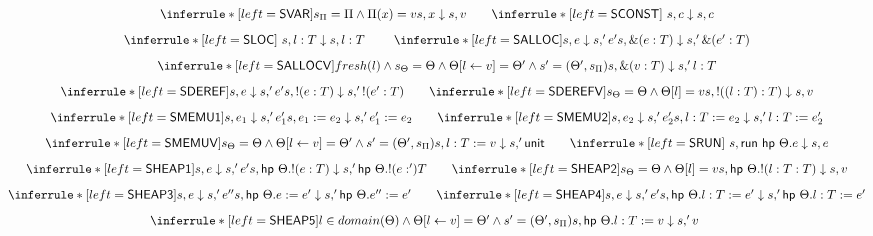 \begin{figure}[H]
 \small
  \[
\begin{array}{@{}c@{}}
   \inferrule*[left=\kw{SVAR}]{s_\kvm = \kvm \wedge \kvm(x) = v}{\eval s x s v} \ \ \ \ \ \
      \inferrule*[left=\kw{SCONST}]{~}{\eval s c s c}\\[2ex]
      \inferrule*[left=\kw{SLOC}]{~}{\eval s {\addr l T} s {\addr l T}}\ \ \ \ \ \ \
      
       \inferrule*[left=\kw{SALLOC}]{\eval s e s' e'}{\eval s {\alloc e T} s' {\alloc {e'} T}}\\[2ex]
       \inferrule*[left=\kw{SALLOCV}]{fresh(l) \wedge s_\Theta = \Theta \wedge \kheap[l \leftarrow v] = \kheap' \wedge s' = (\kheap', s_\kvm)}{\eval s {\alloc v T}s' {\addr l T}}\\[2ex]
       
       \inferrule*[left=\kw{SDEREF}]{\eval s e s' e'}{\eval s {\deref e T} s' {\deref {e'} T}}\ \ \ \ \ \
       \inferrule*[left=\kw{SDEREFV}]{s_\Theta = \Theta  \wedge \kheap[l] = v}{\eval s {\deref {(\addr l T)} T} s v}\\[2ex]      
       \inferrule*[left=\kw{SMEMU1}]{\eval s {e_1} s' {e_1'}}{\eval s {\eass {e_1} {e_2}} s' {\eass {e_1'} {e_2}}}\ \ \ \ \ \
       \inferrule*[left=\kw{SMEMU2}]{\eval s {e_2} s' {e_2'}}{\eval s {\eass {{\addr {l} {T}}} {e_2}} s' {\eass {\addr {l} {T}} {e_2'}}}\\[2ex]
       \inferrule*[left=\kw{SMEMUV}]{s_\Theta = \Theta \wedge \Theta[l \leftarrow v] = \Theta' \wedge s' = (\Theta', s_\Pi)}
       {\eval s {\eass {\addr l T} {v}} s' {\kunit}}\ \ \ \ \ \
        \inferrule*[left=\kw{SRUN}]{~}{\eval s {\run {\hpe \kheap e}} s e}\\[2ex]
       \inferrule*[left=\kw{SHEAP1}]{\eval s {e} s' {e'}}{\eval s {\hpe \kheap {\deref e T}} s' {\hpe \kheap {\deref e' T}}}\ \ \ \ \ \
       \inferrule*[left=\kw{SHEAP2}]{s_\Theta = \Theta  \wedge \kheap[l] = v}{\eval s {\hpe \kheap {\deref {\addr l T} T}} s v} \\[2ex]

       \inferrule*[left=\kw{SHEAP3}]{\eval s {e} s' {e''}}{\eval s {\hpe \kheap {\eass e e'}} s' {\hpe \kheap {\eass {e''} e'}}}\ \ \ \ \ \
       \inferrule*[left=\kw{SHEAP4}]{\eval s {e} s' {e'}}{\eval s {\hpe \kheap {\eass {\addr l T} e'}} s' {\hpe \kheap {\eass {\addr l T} e'}}}\\[2ex]
       
       \inferrule*[left=\kw{SHEAP5}]{l \in domain(\kheap) \wedge \kheap[l \leftarrow v] = \Theta' \wedge s' = (\Theta', s_\Pi)}{\eval s {\hpe \kheap {\eass {\addr l T} v}} s' v}\ \ \ \ \ \
       

\end{array}\]
\end{figure}
